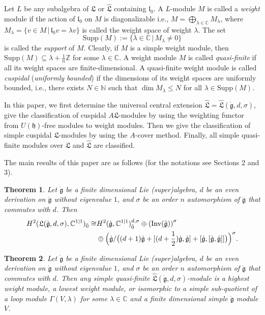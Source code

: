 \documentclass[1p]{elsarticle}
\numberwithin{equation}{section}
\def\dg{\dot{\mathfrak{g}}}
\def\ddg{\ddot{\mathfrak{g}}}
\def\fg{\mathfrak{g}}
\def\fL{\mathfrak{L}}
\def\Supp{\mathrm{Supp}}
\def\bC{\mathbb{C}}
\def\bN{\mathbb{N}}
\def\bZ{\mathbb{Z}}
\def\Inv{{\rm Inv}}
\def\fl{\mathfrak{l}}
\def\hL{\hat{\fL}}
\newtheorem{theo}{{Theorem}}%
\begin{document}
 Let $L$ be any subalgebra of $\fL$ or $\hL$ containing $\fl_0$. A $L$-module $M$ is called a \emph{weight} module if the action of $\fl_0$ on $M$ is diagonalizable i.e., $M=\bigoplus\limits_{\lambda\in\bC}M_\lambda$, where $M_\lambda=\{v\in M\,|\,\fl_0v=\lambda v\}$ is called the weight space of weight $\lambda$. The set $$\Supp(M):=\{\lambda\in\bC\,|\,M_\lambda\neq0\}$$ is called the \emph{support} of $M$.  Clearly, if $M$ is a simple weight module, then $\Supp(M)\subseteq\lambda+\frac{1}{n}\bZ$ for some $\lambda\in\bC$. A weight module $M$ is called \emph{quasi-finite} if all its weight spaces are finite-dimensional.  A quasi-finite weight module is called \emph{cuspidal} (\emph{uniformly bounded}) if the dimensions of its weight spaces are uniformly bounded, i.e., there exists $N\in\bN$ such that $\dim M_\lambda\le N$ for all $\lambda\in\Supp(M)$.

 In this paper, we first determine the universal central extension $\hL=\hL(\dg,d,\sigma)$, give the classification of cuspidal $A\fL$-modules by using the weighting functor from $U(\mathfrak{h})$-free modules to weight modules. Then we give the classification of simple cuspidal $\fL$-modules by using the $A$-cover method. Finally, all simple quasi-finite modules over $\fL$ and $\hL$ are classified.

The main results of this paper are as follows (for the notations see Sections 2 and 3).

\begin{theo}\label{thm1} Let $\dg$ be a finite dimensional Lie (super)algebra, $d$ be an even derivation on $\dg$ without eigenvalue $1$, and $\sigma$ be an order $n$ automorphism of $\dg$ that commutes with $d$. Then $$\aligned H^2(\fL(\dg,d,\sigma),\bC^{1|1})_{\bar 0}\cong & H^2(\dg,\bC^{1|1})_{\bar 0}^{d,\sigma}\oplus {(\Inv(\ddot{\fg}))}^\sigma\\ &\oplus \Big(\dg/\big((d+1)\dg+[(d+\frac 12)\dg,\dg]+ [\dg,[\dg,\dg]]\big)\Big)^{\sigma}.\endaligned$$\end{theo}


  \begin{theo}\label{thm2} Let $\dg$ be a finite dimensional Lie (super)algebra, $d$ be an even derivation on $\dg$ without eigenvalue $1$, and $\sigma$ be an order $n$ automorphism of $\dg$ that commutes with $d$. Then any simple quasi-finite $\hL(\dg,d,\sigma)$-module is  a highest weight module, a lowest weight module, or isomorphic to a simple sub-quotient of a loop module $\Gamma(V,\lambda)$ for some $\lambda\in \bC$ and a finite dimensional simple $\ddg$ module $V$.
   \end{theo}
\end{document}
